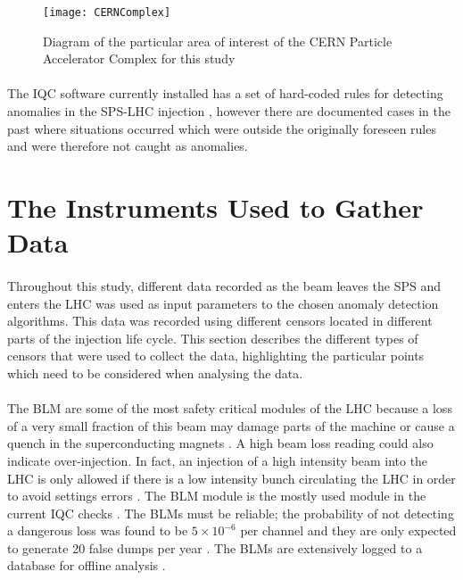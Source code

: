 \begin{figure}[t]
	\centering
	\texttt{[image: CERNComplex]}
	\caption[The CERN Particle Accelerator Complex]{Diagram of the particular area of interest of the CERN Particle Accelerator Complex for this study}
	\label{fig::SPStoLHCInjection}
\end{figure}

\paragraph{ }The \ac{IQC} software currently installed has a set of hard-coded rules for detecting anomalies in the \acs{SPS}-\acs{LHC} injection \cite{Drosdal2011}, however there are documented cases in the past where situations occurred which were outside the originally foreseen rules and were therefore not caught as anomalies.

\section{The Instruments Used to Gather Data}
\paragraph{ }Throughout this study, different data recorded as the beam leaves the \acs{SPS} and enters the \acs{LHC} was used as input parameters to the chosen anomaly detection algorithms. This data was recorded using different censors located in different parts of the injection life cycle. This section describes the different types of censors that were used to collect the data, highlighting the particular points which need to be considered when analysing the data.

\paragraph{ }The \ac{BLM} are some of the most safety critical modules of the \acs{LHC} because a loss of a very small fraction of this beam may damage parts of the machine or cause a quench in the superconducting magnets \cite{Holzer2006}. A high beam loss reading could also indicate over-injection. In fact, an injection of a high intensity beam into the LHC is only allowed if there is a low intensity bunch circulating the LHC in order to avoid settings errors \cite{Kain2010}. The \acs{BLM} module is the mostly used module in the current IQC checks \cite{Drosdal2011}. The \acs{BLM}s must be reliable; the probability of not detecting a dangerous loss was found to be $5\times10^{-6}$ per channel and they are only expected to generate 20 false dumps per year \cite{Holzer2006}. The \acs{BLM}s are extensively logged to a database for offline analysis \cite{Holzer2006}. 

